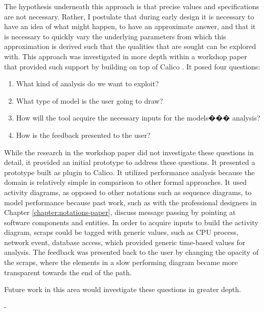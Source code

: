 \documentclass[12pt,fleqn]{ucithesis}
\begin{document}
The hypothesis underneath this approach is that precise values and specifications are not necessary. Rather, I postulate that during early design it is necessary to have an idea of what might happen, to have an approximate answer, and that it is necessary to quickly vary the underlying parameters from which this approximation is derived such that the qualities that are sought can be explored with. 
This approach was investigated in more depth within a workshop paper that provided such support by building on top of Calico \cite{mottalightweight}. It posed four questions:

\begin{enumerate}
	\item What kind of analysis do we want to exploit? 
	\item What type of model is the user going to draw? 
	\item How will the tool acquire the necessary inputs for the models��� analysis? 
	\item How is the feedback presented to the user?
\end{enumerate}

While the research in the workshop paper did not investigate these questions in detail, it provided an initial prototype to address these questions. It presented a prototype built as plugin to Calico. It utilized performance analysis because the domain is relatively simple in comparison to other formal approaches. It used activity diagrams, as opposed to other notations such as sequence diagrams, to model performance because past work, such as with the professional designers in Chapter \ref{chapter:notations-paper}, discuss message passing by pointing at software components and entities. In order to acquire inputs to build the activity diagram, scraps could be tagged with generic values, such as CPU process, network event, database access, which provided generic time-based values for analysis. The feedback was presented back to the user by changing the opacity of the scraps, where the elements in a slow performing diagram became more transparent towards the end of the path.

Future work in this area would investigate these questions in greater depth. 

%
- 
\end{document}
